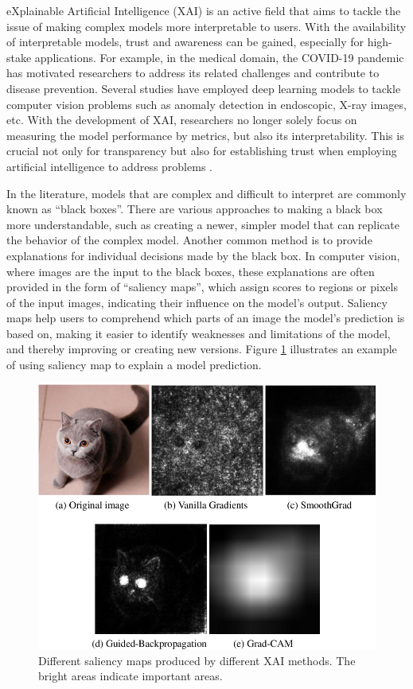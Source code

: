 eXplainable Artificial Intelligence (XAI) is an active field that aims to tackle the issue of making complex models more interpretable to users. With the availability of interpretable models, trust and awareness can be gained, especially for high-stake applications. For example, in the medical domain, the COVID-19 pandemic has motivated researchers to address its related challenges and contribute to disease prevention. Several studies have employed deep learning models to tackle computer vision problems such as anomaly detection in endoscopic, X-ray images, etc. With the development of XAI, researchers no longer solely focus on measuring the model performance by metrics, but also its interpretability. This is crucial not only for transparency but also for establishing trust when employing artificial intelligence to address problems \cite{explainableCovidModel}.

In the literature, models that are complex and difficult to interpret are commonly known as ``black boxes''. There are various approaches to making a black box more understandable, such as creating a newer, simpler model that can replicate the behavior of the complex model. Another common method is to provide explanations for individual decisions made by the black box. In computer vision, where images are the input to the black boxes, these explanations are often provided in the form of ``saliency maps'', which assign scores to regions or pixels of the input images, indicating their influence on the model's output. Saliency maps help users to comprehend which parts of an image the model's prediction is based on, making it easier to identify weaknesses and limitations of the model, and thereby improving or creating new versions. Figure \ref{fig:saliencyExample} illustrates an example of using saliency map to explain a model prediction.

\begin{figure}
    \centering
    \includegraphics[width=\textwidth]{images/saliency_example.png}
    \caption{Different saliency maps produced by different XAI methods. The bright areas indicate important areas. \cite{crowdsourcing}}
    \label{fig:saliencyExample}
\end{figure}

